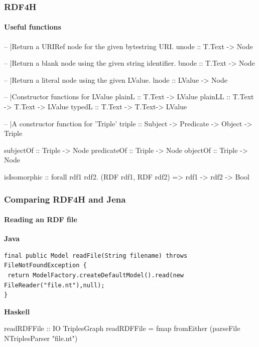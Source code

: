 \documentclass{beamer}
\begin{document}
\begin{frame}[fragile]
\frametitle{RDF4H}
\framesubtitle{Useful functions}

\begin{haskellcode}
-- |Return a URIRef node for the given bytestring URI.
unode :: T.Text -> Node

-- |Return a blank node using the given string identifier.
bnode :: T.Text ->  Node

-- |Return a literal node using the given LValue.
lnode :: LValue ->  Node

-- |Constructor functions for LValue
plainL :: T.Text -> LValue
plainLL :: T.Text -> T.Text -> LValue
typedL :: T.Text -> T.Text-> LValue

-- |A constructor function for 'Triple'
triple :: Subject -> Predicate -> Object -> Triple

subjectOf :: Triple -> Node
predicateOf :: Triple -> Node
objectOf :: Triple -> Node

isIsomorphic :: forall rdf1 rdf2. (RDF rdf1, RDF rdf2) => rdf1 -> rdf2 -> Bool

\end{haskellcode}

\end{frame}


\begin{frame}[fragile]
\frametitle{Comparing RDF4H and Jena}
\framesubtitle{Reading an RDF file}


\textbf{Java}

\begin{lstlisting}[style=MyJavaStyle]
final public Model readFile(String filename) throws FileNotFoundException {
 return ModelFactory.createDefaultModel().read(new FileReader("file.nt"),null);
}
\end{lstlisting}

\bigskip
\textbf{Haskell}

\begin{haskellcode}
readRDFFile :: IO TriplesGraph
readRDFFile = fmap fromEither (parseFile NTriplesParser "file.nt")
\end{haskellcode}

\end{frame}
\end{document}
